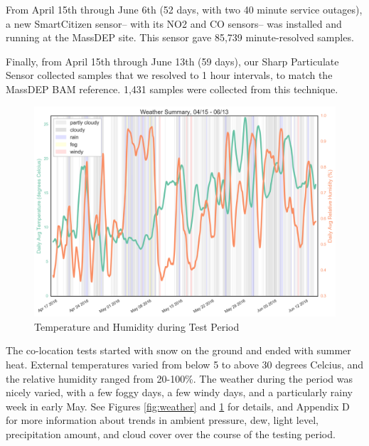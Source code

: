 From April 15th through June 6th (52 days, with two 40 minute service outages), a new SmartCitizen sensor-- with its NO2 and CO sensors-- was installed and running at the MassDEP site.  This sensor gave 85,739 minute-resolved samples.

Finally, from April 15th through June 13th (59 days), our Sharp Particulate Sensor collected samples that we resolved to 1 hour intervals, to match the MassDEP BAM reference.  1,431 samples were collected from this technique.  

\FloatBarrier
\begin{figure}[htb]
 	\includegraphics[width=\textwidth]{figs/weather_summary}               
 	\caption{Temperature and Humidity during Test Period}
  	\label{fig:weather_summary}
\end{figure}
\FloatBarrier

The co-location tests started with snow on the ground and ended with summer heat.  External temperatures varied from below 5 to above 30 degrees Celcius, and the relative humidity ranged from 20-100\%.  The weather during the period was nicely varied, with a few foggy days, a few windy days, and a particularly rainy week in early May.  See Figures \ref{fig:weather} and \ref{fig:weather_summary} for details, and Appendix D for more information about trends in ambient pressure, dew, light level, precipitation amount, and cloud cover over the course of the testing period.   